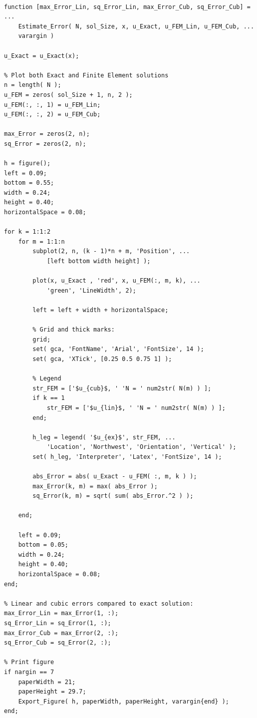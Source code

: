\begin{lstlisting}[caption = {Solution Visualization, Error Estimation and Eventual Convergence}, label = lst:Estimate_Error]

function [max_Error_Lin, sq_Error_Lin, max_Error_Cub, sq_Error_Cub] = ...
    Estimate_Error( N, sol_Size, x, u_Exact, u_FEM_Lin, u_FEM_Cub, ...
    varargin )

u_Exact = u_Exact(x);

% Plot both Exact and Finite Element solutions
n = length( N );
u_FEM = zeros( sol_Size + 1, n, 2 );
u_FEM(:, :, 1) = u_FEM_Lin;
u_FEM(:, :, 2) = u_FEM_Cub;

max_Error = zeros(2, n);
sq_Error = zeros(2, n);

h = figure();
left = 0.09;
bottom = 0.55;
width = 0.24;
height = 0.40;
horizontalSpace = 0.08;

for k = 1:1:2
    for m = 1:1:n
        subplot(2, n, (k - 1)*n + m, 'Position', ...
            [left bottom width height] );
        
        plot(x, u_Exact , 'red', x, u_FEM(:, m, k), ...
            'green', 'LineWidth', 2);
        
        left = left + width + horizontalSpace;

        % Grid and thick marks:
        grid;
        set( gca, 'FontName', 'Arial', 'FontSize', 14 );
        set( gca, 'XTick', [0.25 0.5 0.75 1] );
                
        % Legend
        str_FEM = ['$u_{cub}$, ' 'N = ' num2str( N(m) ) ];
        if k == 1
            str_FEM = ['$u_{lin}$, ' 'N = ' num2str( N(m) ) ];
        end;

        h_leg = legend( '$u_{ex}$', str_FEM, ...
            'Location', 'Northwest', 'Orientation', 'Vertical' );
        set( h_leg, 'Interpreter', 'Latex', 'FontSize', 14 );

        abs_Error = abs( u_Exact - u_FEM( :, m, k ) );
        max_Error(k, m) = max( abs_Error );
        sq_Error(k, m) = sqrt( sum( abs_Error.^2 ) );

    end;
    
    left = 0.09;
    bottom = 0.05;
    width = 0.24;
    height = 0.40;
    horizontalSpace = 0.08;
end;

% Linear and cubic errors compared to exact solution:
max_Error_Lin = max_Error(1, :);
sq_Error_Lin = sq_Error(1, :);
max_Error_Cub = max_Error(2, :);
sq_Error_Cub = sq_Error(2, :);

% Print figure
if nargin == 7
    paperWidth = 21;
    paperHeight = 29.7;
    Export_Figure( h, paperWidth, paperHeight, varargin{end} );
end;

\end{lstlisting}
\clearpage

